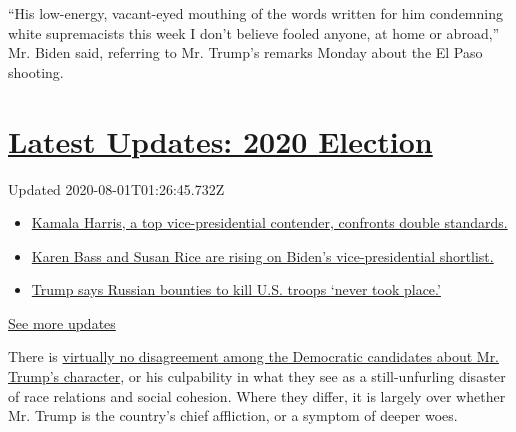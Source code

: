 ``His low-energy, vacant-eyed mouthing of the words written for him
condemning white supremacists this week I don't believe fooled anyone,
at home or abroad,'' Mr. Biden said, referring to Mr. Trump's remarks
Monday about the El Paso shooting.

\hypertarget{latest-updates-2020-election}{%
\section{\texorpdfstring{\href{https://www.nytimes.com/2020/07/31/us/elections/biden-vs-trump.html?action=click\&pgtype=Article\&state=default\&region=MAIN_CONTENT_1\&context=storylines_live_updates}{Latest
Updates: 2020
Election}}{Latest Updates: 2020 Election}}\label{latest-updates-2020-election}}

Updated 2020-08-01T01:26:45.732Z

\begin{itemize}
\tightlist
\item
  \href{https://www.nytimes.com/2020/07/31/us/elections/biden-vs-trump.html?action=click\&pgtype=Article\&state=default\&region=MAIN_CONTENT_1\&context=storylines_live_updates\#link-29fdff45}{Kamala
  Harris, a top vice-presidential contender, confronts double
  standards.}
\item
  \href{https://www.nytimes.com/2020/07/31/us/elections/biden-vs-trump.html?action=click\&pgtype=Article\&state=default\&region=MAIN_CONTENT_1\&context=storylines_live_updates\#link-13ec3d9c}{Karen
  Bass and Susan Rice are rising on Biden's vice-presidential
  shortlist.}
\item
  \href{https://www.nytimes.com/2020/07/31/us/elections/biden-vs-trump.html?action=click\&pgtype=Article\&state=default\&region=MAIN_CONTENT_1\&context=storylines_live_updates\#link-49e9a016}{Trump
  says Russian bounties to kill U.S. troops `never took place.'}
\end{itemize}

\href{https://www.nytimes.com/2020/07/31/us/elections/biden-vs-trump.html?action=click\&pgtype=Article\&state=default\&region=MAIN_CONTENT_1\&context=storylines_live_updates}{See
more updates}

There is
\href{https://www.nytimes.com/2019/08/05/us/politics/beto-trump.html}{virtually
no disagreement among the Democratic candidates about Mr. Trump's
character}, or his culpability in what they see as a still-unfurling
disaster of race relations and social cohesion. Where they differ, it is
largely over whether Mr. Trump is the country's chief affliction, or a
symptom of deeper woes.

